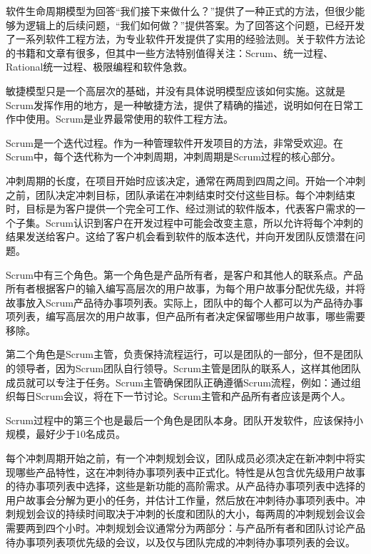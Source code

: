 
软件生命周期模型为回答“我们接下来做什么？”提供了一种正式的方法，但很少能够为逻辑上的后续问题，“我们如何做？”提供答案。为了回答这个问题，已经开发了一系列软件工程方法，为专业软件开发提供了实用的经验法则。关于软件方法论的书籍和文章有很多，但其中一些方法特别值得关注：Scrum、统一过程、Rational统一过程、极限编程和软件急救。


敏捷模型只是一个高层次的基础，并没有具体说明模型应该如何实施。这就是Scrum发挥作用的地方，是一种敏捷方法，提供了精确的描述，说明如何在日常工作中使用。Scrum是业界最常使用的软件工程方法。

Scrum是一个迭代过程。作为一种管理软件开发项目的方法，非常受欢迎。在Scrum中，每个迭代称为一个冲刺周期，冲刺周期是Scrum过程的核心部分。

冲刺周期的长度，在项目开始时应该决定，通常在两周到四周之间。开始一个冲刺之前，团队决定冲刺目标，团队承诺在冲刺结束时交付这些目标。每个冲刺结束时，目标是为客户提供一个完全可工作、经过测试的软件版本，代表客户需求的一个子集。Scrum认识到客户在开发过程中可能会改变主意，所以允许将每个冲刺的结果发送给客户。这给了客户机会看到软件的版本迭代，并向开发团队反馈潜在问题。


Scrum中有三个角色。第一个角色是产品所有者，是客户和其他人的联系点。产品所有者根据客户的输入编写高层次的用户故事，为每个用户故事分配优先级，并将故事放入Scrum产品待办事项列表。实际上，团队中的每个人都可以为产品待办事项列表，编写高层次的用户故事，但产品所有者决定保留哪些用户故事，哪些需要移除。

第二个角色是Scrum主管，负责保持流程运行，可以是团队的一部分，但不是团队的领导者，因为Scrum团队自行领导。Scrum主管是团队的联系人，这样其他团队成员就可以专注于任务。Scrum主管确保团队正确遵循Scrum流程，例如：通过组织每日Scrum会议，将在下一节讨论。Scrum主管和产品所有者应该是两个人。

Scrum过程中的第三个也是最后一个角色是团队本身。团队开发软件，应该保持小规模，最好少于10名成员。


每个冲刺周期开始之前，有一个冲刺规划会议，团队成员必须决定在新冲刺中将实现哪些产品特性，这在冲刺待办事项列表中正式化。特性是从包含优先级用户故事的待办事项列表中选择，这些是新功能的高阶需求。从产品待办事项列表中选择的用户故事会分解为更小的任务，并估计工作量，然后放在冲刺待办事项列表中。冲刺规划会议的持续时间取决于冲刺的长度和团队的大小，每两周的冲刺规划会议会需要两到四个小时。冲刺规划会议通常分为两部分：与产品所有者和团队讨论产品待办事项列表项优先级的会议，以及仅与团队完成的冲刺待办事项列表的会议。

